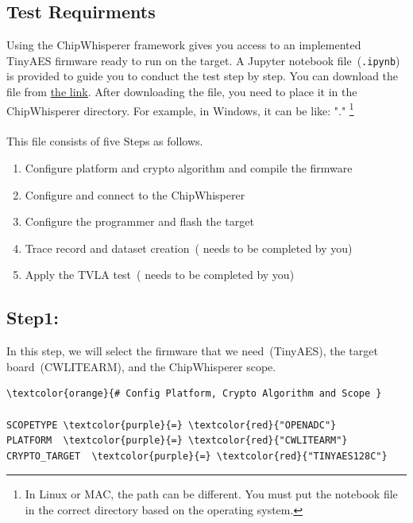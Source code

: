 \documentclass[11pt]{article}
\newcommand{\inRed}[1]{\textcolor{myred}{#1}}
\begin{document}
\subsection{Test Requirments}
Using the ChipWhisperer framework gives you access to an implemented TinyAES firmware ready to run on the target. A Jupyter notebook file~(\texttt{.ipynb}) is provided to guide you to conduct the test step by step. You can download the file from \href{https://mega.nz/file/pggmkDqK#Bh2cE_imutKkWBbRUpEl8mkgE8pxKxfeaInNOgVU_yE} {the link}. After downloading the file, you need to place it in the ChipWhisperer directory. For example, in Windows, it can be like: "." \footnote{In Linux or MAC, the path can be different. You must put the notebook file in the correct directory based on the operating system.}\\\\ This file consists of five Steps as follows. 
\begin{enumerate}
    \item Configure platform and crypto algorithm and compile the firmware 
    \item Configure and connect to the ChipWhisperer
    \item Configure the programmer and flash the target
    \item Trace record and dataset creation~( \inRed {needs to be completed by you})
    \item Apply the TVLA test~( \inRed{needs to be completed by you})
\end{enumerate}

\subsection{Step1:}
In this step, we will select the firmware that we need~(TinyAES), the target board~(CWLITEARM), and the ChipWhisperer scope. \\  

\begin{small} 
\begin{tcolorbox}
\begin{Verbatim}[commandchars=\\\{\}]
\textcolor{orange}{# Config Platform, Crypto Algorithm and Scope }

SCOPETYPE \textcolor{purple}{=} \textcolor{red}{"OPENADC"}
PLATFORM  \textcolor{purple}{=} \textcolor{red}{"CWLITEARM"}
CRYPTO_TARGET  \textcolor{purple}{=} \textcolor{red}{"TINYAES128C"}
\end{Verbatim}
\end{tcolorbox}
\end{small} 
\end{document}
